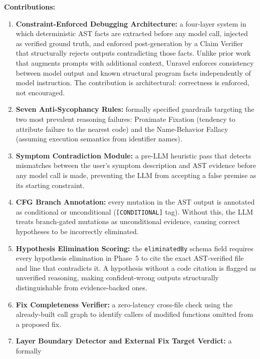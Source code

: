 \documentclass[12pt,a4paper]{article}
\newcommand{\code}[1]{\texttt{\small #1}}
\begin{document}
\vspace{6pt}
\begin{contribbox}
\textbf{Contributions:}
\begin{enumerate}[leftmargin=1.8em, itemsep=4pt]
  \item \textbf{Constraint-Enforced Debugging Architecture:} a four-layer system in which
        deterministic AST facts are extracted before any model call, injected as verified
        ground truth, and enforced post-generation by a Claim Verifier that structurally
        rejects outputs contradicting those facts. Unlike prior work that augments prompts
        with additional context, Unravel enforces consistency between model output and
        known structural program facts independently of model instruction. The contribution
        is architectural: correctness is enforced, not encouraged.
  \item \textbf{Seven Anti-Sycophancy Rules:} formally specified guardrails targeting the
        two most prevalent reasoning failures: Proximate Fixation (tendency to attribute
        failure to the nearest code) and the Name-Behavior Fallacy (assuming execution
        semantics from identifier names).
  \item \textbf{Symptom Contradiction Module:} a pre-LLM heuristic pass that detects
        mismatches between the user's symptom description and AST evidence before any
        model call is made, preventing the LLM from accepting a false premise as its
        starting constraint.
  \item \textbf{CFG Branch Annotation:} every mutation in the AST output is annotated
        as conditional or unconditional (\code{[CONDITIONAL]} tag). Without this,
        the LLM treats branch-gated mutations as unconditional evidence, causing
        correct hypotheses to be incorrectly eliminated.
  \item \textbf{Hypothesis Elimination Scoring:} the \code{eliminatedBy} schema field
        requires every hypothesis elimination in Phase~5 to cite the exact AST-verified
        file and line that contradicts it. A hypothesis without a code citation is
        flagged as unverified reasoning, making confident-wrong outputs structurally
        distinguishable from evidence-backed ones.
  \item \textbf{Fix Completeness Verifier:} a zero-latency cross-file check using the
        already-built call graph to identify callers of modified functions omitted from a
        proposed fix.
  \item \textbf{Layer Boundary Detector and External Fix Target Verdict:} a formally

\end{enumerate}
\end{contribbox}
\end{document}
